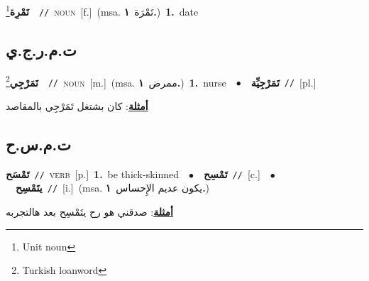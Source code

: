 \documentclass[10pt,a4paper,twoside]{article} %
\begin{document}
\begin{multicols}{2}
{\setlength\topsep{0pt}\textbf{\foreignlanguage{arabic}{تَمْرِة}}\footnote{Unit noun}\ \ {\color{gray}\texttt{//}\color{black}}\ \textsc{noun}\ [f.]\ \color{gray}(msa. \foreignlanguage{arabic}{تَمْرَة}~\foreignlanguage{arabic}{\textbf{١.}})\color{black}\ \textbf{1.}~date\ } \vspace{2mm}

\vspace{-3mm}
\subsection*{\color{blue}\foreignlanguage{arabic}{ت.م.ر.ج.ي}\color{blue}{ (ntws)}} 

{\setlength\topsep{0pt}\textbf{\foreignlanguage{arabic}{تَمَرْجِي}}\footnote{Turkish loanword}\ \ {\color{gray}\texttt{//}\color{black}}\ \textsc{noun}\ [m.]\ \color{gray}(msa. \foreignlanguage{arabic}{ممرض}~\foreignlanguage{arabic}{\textbf{١.}})\color{black}\ \textbf{1.}~nurse\ \ $\bullet$\ \ \setlength\topsep{0pt}\textbf{\foreignlanguage{arabic}{تَمَرْجِيِّة}}\ {\color{gray}\texttt{//}\color{black}}\ [pl.]\  \begin{flushright}\color{gray}\foreignlanguage{arabic}{\textbf{\underline{\foreignlanguage{arabic}{أمثلة}}}: كان بشتغل تَمَرْجِي بالمقاصد}\end{flushright}\color{black}} \vspace{2mm}

\vspace{-3mm}
\subsection*{\color{blue}\foreignlanguage{arabic}{ت.م.س.ح}\color{blue}{}} 

{\setlength\topsep{0pt}\textbf{\foreignlanguage{arabic}{تَمْسَح}}\ {\color{gray}\texttt{//}\color{black}}\ \textsc{verb}\ [p.]\ \textbf{1.}~be thick-skinned\ \ $\bullet$\ \ \setlength\topsep{0pt}\textbf{\foreignlanguage{arabic}{تَمْسِح}}\ {\color{gray}\texttt{//}\color{black}}\ [c.]\ \ $\bullet$\ \ \setlength\topsep{0pt}\textbf{\foreignlanguage{arabic}{يتَمْسِح}}\ {\color{gray}\texttt{//}\color{black}}\ [i.]\ \color{gray}(msa. \foreignlanguage{arabic}{يكون عديم الإِحساس}~\foreignlanguage{arabic}{\textbf{١.}})\color{black}\  \begin{flushright}\color{gray}\foreignlanguage{arabic}{\textbf{\underline{\foreignlanguage{arabic}{أمثلة}}}: صدقني هو رح يتَمْسِح بعد هالتجربه}\end{flushright}\color{black}} \vspace{2mm}


\end{multicols}
\end{document}
